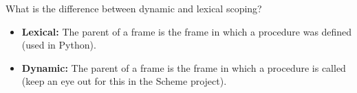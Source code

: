 \begin{blocksection}
\question What is the difference between dynamic and lexical scoping?

\begin{solution}[0.5in]
\begin{itemize}
    \item \textbf{Lexical:} The parent of a frame is the frame in which a
        procedure was defined (used in Python).
    \item \textbf{Dynamic:} The parent of a frame is the frame in which a
        procedure is called (keep an eye out for this in the Scheme project).
\end{itemize}
\end{solution}
\end{blocksection}
